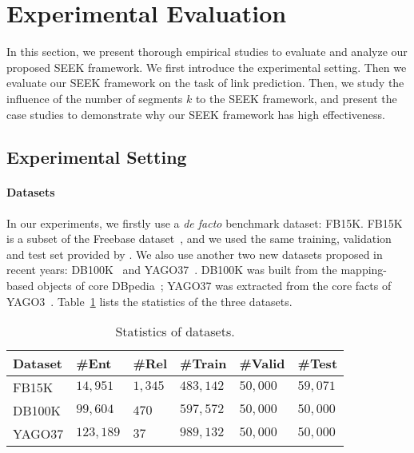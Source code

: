 \documentclass[11pt,a4paper]{article}
\newcommand{\TableSize}{\footnotesize} \renewcommand{\thefootnote}{\fnsymbol{footnote}}
\begin{document}
 \section{Experimental Evaluation}

\label{sec:exp}
In this section, we present thorough empirical studies to evaluate and analyze our proposed SEEK framework. 
We first introduce the experimental setting. Then we evaluate our SEEK framework on the task of link prediction. Then, we study the influence of the number of segments $k$ to the SEEK framework, and present the case studies to demonstrate why our SEEK framework has high effectiveness.

\subsection{Experimental Setting}
\paragraph*{Datasets}
In our experiments, we firstly use a \textit{de facto} benchmark dataset: FB15K. FB15K is a subset of the Freebase dataset~\cite{bollacker2008freebase}, and we used the same training, validation and test set provided by \cite{bordes2013translating}. We also use another two new datasets proposed in recent years: DB100K~\cite{boyang2018:aer} and YAGO37~\cite{guo2018:RUGE}. DB100K was built from the mapping-based objects of core DBpedia~\cite{bizer2009dbpedia}; YAGO37 was extracted from the core facts of YAGO3~\cite{mahdisoltani2013yago3}. Table~\ref{tab:datasets} lists the statistics of the three datasets.

\begin{table}[!h]
	\centering
	\TableSize
	\begin{tabular}{ p{3.4em} | p{2.9em}  p{1.9em}  p{3em}  p{2.5em}  p{2.5em} }
		\toprule
		\textbf{Dataset} & \textbf{\#Ent} & \textbf{\#Rel} & \textbf{\#Train} & \textbf{\#Valid} & \textbf{\#Test} \\
		\midrule
		FB15K & $14,951$ & $1,345$ & $483,142$ & $50,000$ & $59,071$  \\
		DB100K & $99,604$ &  $470$ &  $597,572$ &  $50,000$ &  $50,000$ \\
		YAGO37 & $123,189$ & $37$ & $989,132$ & $50,000$ & $50,000$ \\
		\bottomrule
	\end{tabular}
	\caption{Statistics of datasets.}
	\label{tab:datasets}
\end{table}
\end{document}

